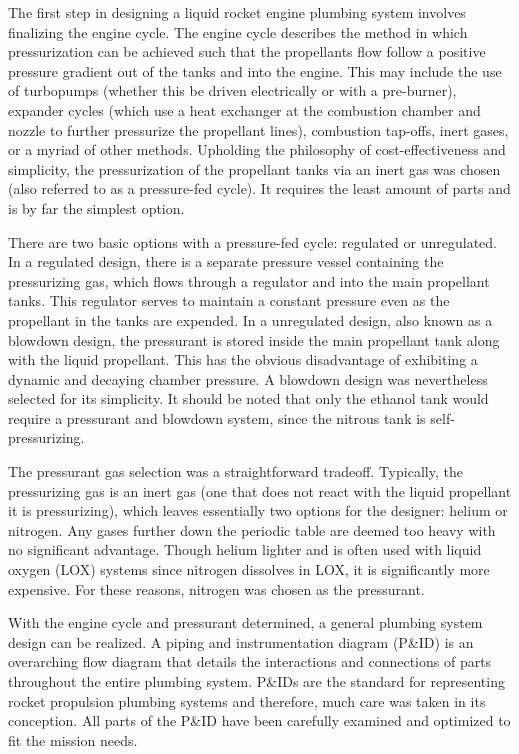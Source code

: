 \documentclass[9pt]{article} %
\numberwithin{equation}{section} %
\begin{document}
\hspace{\parindent} The first step in designing a liquid rocket engine plumbing system involves finalizing the engine cycle. The engine cycle describes the method in which pressurization can be achieved such that the propellants flow follow a positive pressure gradient out of the tanks and into the engine. This may include the use of turbopumps (whether this be driven electrically or with a pre-burner), expander cycles (which use a heat exchanger at the combustion chamber and nozzle to further pressurize the propellant lines), combustion tap-offs, inert gases, or a myriad of other methods. Upholding the philosophy of cost-effectiveness and simplicity, the pressurization of the propellant tanks via an inert gas was chosen (also referred to as a pressure-fed cycle). It requires the least amount of parts and is by far the simplest option.

There are two basic options with a pressure-fed cycle: regulated or unregulated. In a regulated design, there is a separate pressure vessel containing the pressurizing gas, which flows through a regulator and into the main propellant tanks. This regulator serves to maintain a constant pressure even as the propellant in the tanks are expended. In a unregulated design, also known as a blowdown design, the pressurant is stored inside the main propellant tank along with the liquid propellant. This has the obvious disadvantage of exhibiting a dynamic and decaying chamber pressure. A blowdown design was nevertheless selected for its simplicity. It should be noted that only the ethanol tank would require a pressurant and blowdown system, since the nitrous tank is self-pressurizing.

The pressurant gas selection was a straightforward tradeoff. Typically, the pressurizing gas is an inert gas (one that does not react with the liquid propellant it is pressurizing), which leaves essentially two options for the designer: helium or nitrogen. Any gases further down the periodic table are deemed too heavy with no significant advantage. Though helium lighter and is often used with liquid oxygen (LOX) systems since nitrogen dissolves in LOX, it is significantly more expensive. For these reasons, nitrogen was chosen as the pressurant.

With the engine cycle and pressurant determined, a general plumbing system design can be realized. A piping and instrumentation diagram (P\&ID) is an overarching flow diagram that details the interactions and connections of parts throughout the entire plumbing system. P\&IDs are the standard for representing rocket propulsion plumbing systems and therefore, much care was taken in its conception. All parts of the P\&ID have been carefully examined and optimized to fit the mission needs.
\end{document}
